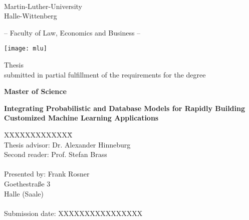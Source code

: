 \label{Titelseite}

\begin{titlepage}
\begin{center}

\ 

\vspace{2\baselineskip}

Martin-Luther-University\\
Halle-Wittenberg

\vspace{\baselineskip}

-- Faculty of Law, Economics and Business --

\vspace{\baselineskip}

\texttt{[image: mlu]}

\vspace{2\baselineskip}

Thesis\\
submitted in partial fulfillment of the requirements for the degree

\textbf{Master of Science}

\vspace{2\baselineskip}

\renewcommand{\baselinestretch}{1.4}\normalsize
\textbf{\Large{Integrating Probabilistic and Database Models for Rapidly Building Customized Machine Learning Applications}}

\renewcommand{\baselinestretch}{1.00}\normalsize
\vspace{\baselineskip}

\vspace*{2\baselineskip}

\parbox{0cm}{
\begin{tabbing}
XXXXXXXXXXXXX\= \kill \\ 
Thesis advisor:\> Dr. Alexander Hinneburg\\
Second reader:\> Prof. Stefan Brass\\
\\
Presented by:
\> Frank Rosner\\
\> Goethestraße 3\\
 Halle (Saale)\\
\\
Submission date: \>XXXXXXXXXXXXXXXX
\end{tabbing}}

\end{center}
\end{titlepage}
